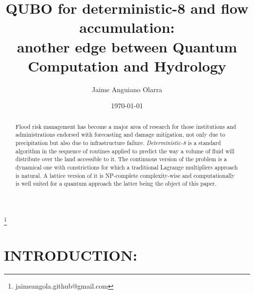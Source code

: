 \documentclass[%
 reprint,
 amsmath,amssymb,
 aps,
]{revtex4-2}
\begin{document}

\title{QUBO for deterministic-8 and flow accumulation:\\another edge between Quantum Computation and Hydrology}%
\thanks{jaimeangola.github@gmail.com}%

\author{Jaime Anguiano Olarra}

\date{\today}%

\begin{abstract}
Flood risk management has become a major area of research for those institutions and administrations endorsed with forecasting and damage mitigation, not only due to precipitation but also due to infrastructure failure. \textit{Deterministic-8} is a standard algorithm in the sequence of routines applied to predict the way a volume of fluid will distribute over the land accessible to it. The continuous version of the problem is a dynamical one with constrictions for which a traditional Lagrange multipliers approach is natural. A lattice version of it is NP-complete complexity-wise and computationally is well suited for a quantum approach the latter being the object of this paper.
\end{abstract}

\maketitle


\section{\label{sec:level1}INTRODUCTION:}
\end{document}
